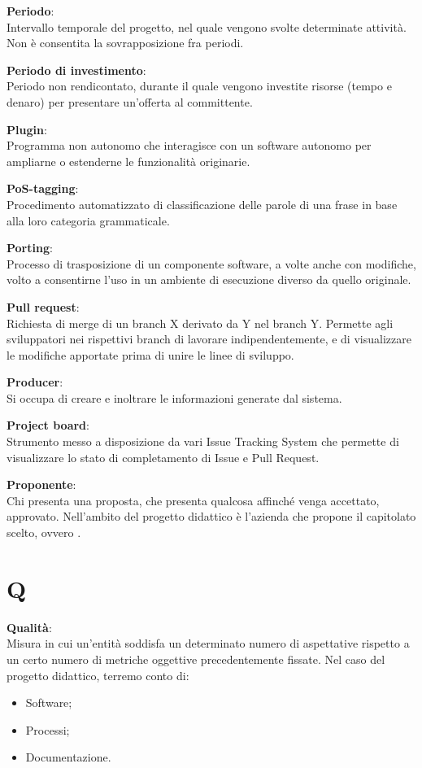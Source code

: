 \documentclass[a4paper, oneside, openany, dvipsnames, table]{article}
\begin{document}
\textbf{Periodo}:\\	Intervallo temporale del progetto, nel quale vengono svolte determinate attività. Non è consentita la sovrapposizione fra periodi.

\textbf{Periodo di investimento}:\\	Periodo non rendicontato, durante il quale vengono investite risorse (tempo e denaro) per presentare un'offerta al committente.

\textbf{Plugin}:\\	Programma non autonomo che interagisce con un software autonomo per ampliarne o estenderne le funzionalità originarie.

\textbf{PoS-tagging}:\\	Procedimento automatizzato di classificazione delle parole di una frase in base alla loro categoria grammaticale.

\textbf{Porting}:\\	Processo di trasposizione di un componente software, a volte anche con modifiche, volto a consentirne l'uso in un ambiente di esecuzione diverso da quello originale.

\textbf{Pull request}:\\	Richiesta di merge di un branch X derivato da Y nel branch Y. Permette agli sviluppatori nei rispettivi branch di lavorare indipendentemente, e di visualizzare le modifiche apportate prima di unire le linee di sviluppo.

\textbf{Producer}:\\	Si occupa di creare e inoltrare le informazioni generate dal sistema.

\textbf{Project board}:\\	Strumento messo a disposizione da vari Issue Tracking System che permette di visualizzare lo stato di completamento di Issue e Pull Request.


\textbf{Proponente}:\\	Chi presenta una proposta, che presenta qualcosa affinché venga accettato, approvato. Nell'ambito del progetto didattico è l'azienda che propone il capitolato scelto, ovvero \proponente .


\newpage
\section{Q}
\textbf{Qualità}:\\	Misura in cui un'entità soddisfa un determinato numero di aspettative rispetto a un certo numero di metriche oggettive precedentemente fissate. Nel caso del progetto didattico, terremo conto di:
\begin{itemize}
	\item Software;
	\item Processi;
	\item Documentazione.
\end{itemize}
\end{document}
